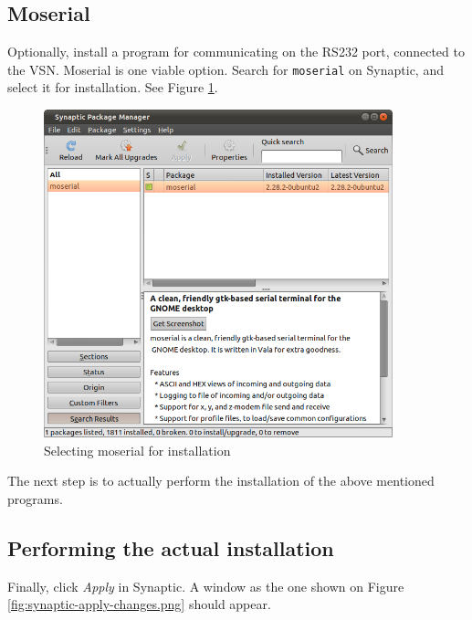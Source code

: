 \documentclass[a4paper, 10pt]{article}
\begin{document}
\subsection{Moserial}

Optionally, install a program for communicating on the RS232 port,
connected to the VSN.
Moserial is one viable option.
Search for \verb+moserial+ on Synaptic, and select it for installation.
See Figure \ref{fig:synaptic-moserial}.


    \begin{figure}[H]
    \centering
        \includegraphics[width=0.9\textwidth]{./png-install-guide/synaptic-moserial.png}
        \caption{Selecting moserial for installation}
        \label{fig:synaptic-moserial}
    \end{figure}


The next step is to actually perform the installation of the above mentioned programs.

\subsection{Performing the actual installation}

Finally, click \emph{Apply} in Synaptic.
A window as the one shown on Figure \ref{fig:synaptic-apply-changes.png}
should appear.
\end{document}
